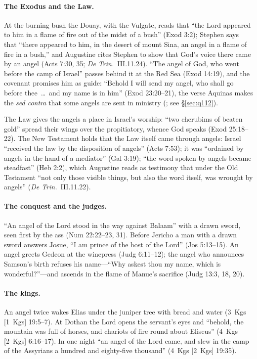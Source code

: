 \paragraph{The Exodus and the Law.} At the burning bush the Douay, with
the Vulgate, reads that ``the Lord appeared to him in a flame of fire out
of the midst of a bush'' (Exod 3:2); Stephen says that ``there appeared to
him, in the desert of mount Sina, an angel in a flame of fire in a bush,''
and Augustine cites Stephen to show that God's voice there came by an
angel (Acts 7:30, 35; \emph{De Trin.}\ III.11.24). ``The angel of God, who
went before the camp of Israel'' passes behind it at the Red Sea (Exod
14:19), and the covenant promises him as guide: ``Behold I will send my
angel, who shall go before thee~\dots\ and my name is in him'' (Exod
23:20--21), the verse Aquinas makes the \emph{sed contra} that some angels
are sent in ministry (; see \S\ref{sec:q112}).

The Law gives the angels a place in Israel's worship: ``two cherubims of
beaten gold'' spread their wings over the propitiatory, whence God speaks
(Exod 25:18--22). The New Testament holds that the Law itself came through
angels: Israel ``received the law by the disposition of angels'' (Acts
7:53); it was ``ordained by angels in the hand of a mediator'' (Gal 3:19);
``the word spoken by angels became steadfast'' (Heb 2:2), which Augustine
reads as testimony that under the Old Testament ``not only those visible
things, but also the word itself, was wrought by angels'' (\emph{De
Trin.}\ III.11.22).

\paragraph{The conquest and the judges.} ``An angel of the Lord stood in
the way against Balaam'' with a drawn sword, seen first by the ass (Num
22:22--23, 31). Before Jericho a man with a drawn sword answers Josue, ``I
am prince of the host of the Lord'' (Jos 5:13--15). An angel greets Gedeon
at the winepress (Judg 6:11--12); the angel who announces Samson's birth
refuses his name---``Why askest thou my name, which is wonderful?''---and
ascends in the flame of Manue's sacrifice (Judg 13:3, 18, 20).

\paragraph{The kings.} An angel twice wakes Elias under the juniper tree
with bread and water (3~Kgs [1~Kgs] 19:5--7). At Dothan the Lord opens the
servant's eyes and ``behold, the mountain was full of horses, and chariots
of fire round about Eliseus'' (4~Kgs [2~Kgs] 6:16--17). In one night ``an
angel of the Lord came, and slew in the camp of the Assyrians a hundred and
eighty-five thousand'' (4~Kgs [2~Kgs] 19:35).

